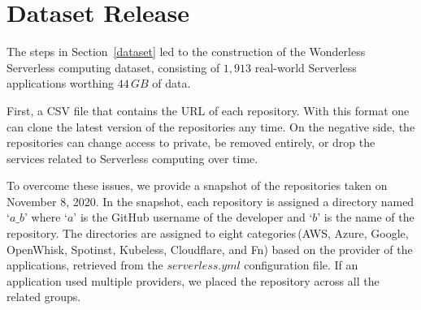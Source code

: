 
\section{Dataset Release}
\label{schema}

The steps in Section~\ref{dataset} led to the construction of the
 Wonderless Serverless computing dataset, consisting of $1,913$
real-world Serverless applications worthing $44 \, GB$ of data. 

First, a CSV file that contains the URL of each repository. 
With this format one can clone the latest version of the repositories any time. 
On the negative side, the repositories can change access to private, 
be removed entirely, or drop the services related to Serverless computing 
over time. 

To overcome these issues, we provide a snapshot of the 
repositories taken on November 8, 2020. 
In the snapshot, each repository is assigned a directory named `$a\_b$' 
where `$a$' is the GitHub username of the developer and `$b$' is the name of the repository. 
The directories are assigned to eight categories\,(AWS, Azure, Google, OpenWhisk, Spotinst, 
Kubeless, Cloudflare, and Fn) based on the provider of the applications,
retrieved from the $serverless.yml$ configuration file. 
If an application used multiple providers, we placed the repository across 
all the related groups. 
